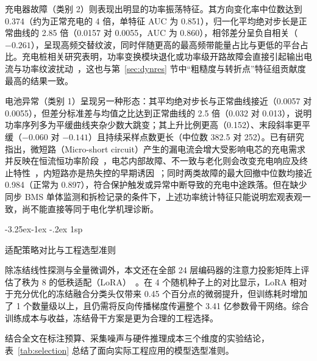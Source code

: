 \documentclass[12pt]{iopjournal}
\makeatletter
\renewcommand\subsection{\@startsection{subsection}{2}{\z@}%
                   {-3.25ex\@plus -1ex \@minus -.2ex}%
                   {1sp}%
                   {\reset@font\normalsize\bfseries\raggedright}}
\makeatother
\begin{document}
充电器故障（类别 2）则表现出明显的功率振荡特征。其方向变化率中位数达到 0.374（约为正常充电的 4 倍，单特征 AUC 为 0.851），归一化平均绝对步长是正常曲线的 2.85 倍（0.0157 对 0.0055，AUC 为 0.860），相邻差分呈负自相关（$-0.261$），呈现高频交替纹波，同时伴随更高的最高频带能量占比与更低的平台占比。充电桩相关研究表明，功率变换模块退化或功率级开路故障会直接引起输出电流与功率纹波扰动~\cite{park2022,xu2025}，这也与第~\ref{sec:dynres} 节中“粗糙度与转折点”特征组贡献度最高的结果一致。

电池异常（类别 1）呈现另一种形态：其平均绝对步长与正常曲线接近（0.0057 对 0.0055），但差分标准差与均值之比达到正常曲线的 2.5 倍（0.032 对 0.013），说明功率序列多为平缓曲线夹杂少数大跳变；其上升比例更高（0.152）、末段斜率更平缓（$-0.060$ 对 $-0.141$）且持续采样点数更长（中位数 382.5 对 252）。已有研究指出，微短路（Micro-short circuit）产生的漏电流会增大受影响电芯的充电需求并反映在恒流恒功率阶段~\cite{kong2018}，电芯内部故障、不一致与老化则会改变充电响应及终止特性~\cite{hu2020,lu2013}，内短路亦是热失控的早期诱因~\cite{feng2018}；同时两类故障的最大回撤中位数均接近 0.984（正常为 0.897），符合保护触发或异常中断导致的充电中途跌落。但在缺少同步 BMS 单体监测和拆检记录的条件下，上述功率统计特征只能说明宏观表观一致，尚不能直接等同于电化学机理诊断。

\subsection{适配策略对比与工程选型准则}\label{sec:selection}

除冻结线性探测与全量微调外，本文还在全部 24 层编码器的注意力投影矩阵上评估了秩为 8 的低秩适配（LoRA）~\cite{hu2022}。在 4 个随机种子上的对比显示，LoRA 相对于充分优化的冻结融合分类头仅带来 0.45 个百分点的微弱提升，但训练耗时增加了 1 个数量级以上，且仍需将反向传播梯度传遍整个 3.41 亿参数骨干网络。综合训练成本与收益，冻结骨干方案是更为合理的工程选择。

结合全文在标注预算、采集噪声与硬件推理成本三个维度的实验结论，表~\ref{tab:selection} 总结了面向实际工程应用的模型选型准则。
\end{document}
